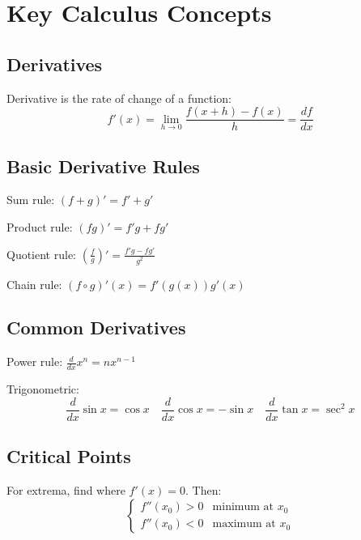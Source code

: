 \documentclass{article}
\begin{document}
\section*{Key Calculus Concepts}

\subsection*{Derivatives}
Derivative is the rate of change of a function:
\[f'(x)=\lim_{h\to0}\frac{f(x+h)-f(x)}{h} = \frac{df}{dx}\]

\subsection*{Basic Derivative Rules}
Sum rule: $(f+g)'=f'+g'$

Product rule: $(fg)'=f'g+fg'$

Quotient rule: $\left(\frac{f}{g}\right)'=\frac{f'g-fg'}{g^2}$

Chain rule: $(f\circ g)'(x)=f'(g(x))g'(x)$

\subsection*{Common Derivatives}
Power rule: $\frac{d}{dx}x^n=nx^{n-1}$

Trigonometric:
\[\frac{d}{dx}\sin x=\cos x \quad \frac{d}{dx}\cos x=-\sin x \quad \frac{d}{dx}\tan x=\sec^2 x\]

\subsection*{Critical Points}
For extrema, find where $f'(x)=0$. Then:
\[
\begin{cases}
f''(x_0)>0 & \text{minimum at }x_0\\
f''(x_0)<0 & \text{maximum at }x_0
\end{cases}
\]
\end{document}
